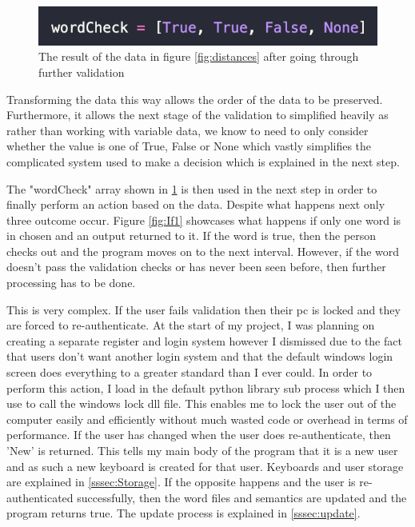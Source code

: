 \documentclass[10pt,a4paper]{report}
\begin{document}
\begin{figure}[h]
	\centering
	\includegraphics{WordCheck}
	\caption{The result of the data in figure \ref{fig:distances} after going through further validation}
	\label{fig:wordCheck}
\end{figure}

Transforming the data this way allows the order of the data to be preserved. Furthermore, it allows the next stage of the validation to simplified heavily as rather than working with variable data, we know to need to only consider whether the value is one of True, False or None which vastly simplifies the complicated system used to make a decision which is explained in the next step.

The "wordCheck" array shown in \ref{fig:wordCheck} is then used in the next step in order to finally perform an action based on the data. Despite what happens next only three outcome occur. Figure \ref{fig:If1} showcases what happens if only one word is in chosen and an output returned to it. If the word is true, then the person checks out and the program moves on to the next interval. However, if the word doesn't pass the validation checks or has never been seen before, then further processing has to be done. 

This is very complex. If the user fails validation then their pc is locked and they are forced to re-authenticate. At the start of my project, I was planning on creating a separate register and login system however I dismissed due to the fact that users don't want another login system and that the default windows login screen does everything to a greater standard than I ever could. In order to perform this action, I load in the default python library sub process \cite{subprocess} which I then use to call the windows lock dll file. This enables me to lock the user out of the computer easily and efficiently without much wasted code or overhead in terms of performance. If the user has changed when the user does re-authenticate, then 'New' is returned. This tells my main body of the program that it is a new user and as such a new keyboard is created for that user. Keyboards and user storage are explained in \ref{sssec:Storage}. If the opposite happens and the user is re-authenticated successfully, then the word files and semantics are updated and the program returns true. The update process is explained in \ref{sssec:update}.
\end{document}

